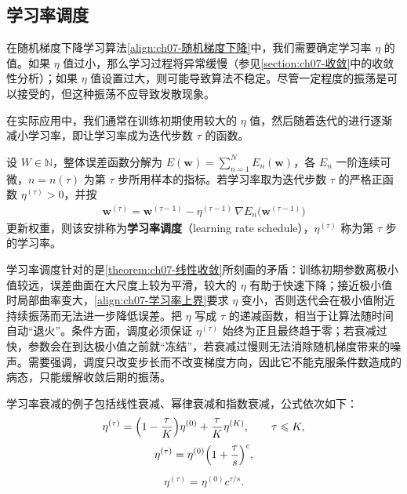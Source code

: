 \documentclass[../../main.tex]{subfiles}
\begin{document}
\subsection{学习率调度}\label{subsection:ch07-学习率调度}

在随机梯度下降学习算法\eqref{align:ch07-随机梯度下降}中，我们需要确定学习率 $\eta$ 的值。如果 $\eta$ 值过小，那么学习过程将异常缓慢（参见\cref{section:ch07-收敛}中的收敛性分析）；如果 $\eta$ 值设置过大，则可能导致算法不稳定。尽管一定程度的振荡是可以接受的，但这种振荡不应导致发散现象。

在实际应用中，我们通常在训练初期使用较大的 $\eta$ 值，然后随着迭代的进行逐渐减小学习率，即让学习率成为迭代步数 $\tau$ 的函数。

\begin{definition}[学习率调度]\label{definition:ch07-学习率调度}
设 $W\in\mathbb{N}$，整体误差函数分解为 $E(\mathbf{w})=\sum_{n=1}^{N}E_{n}(\mathbf{w})$，各 $E_{n}$ 一阶连续可微，$n=n(\tau)$ 为第 $\tau$ 步所用样本的指标。若学习率取为迭代步数 $\tau$ 的严格正函数 $\eta^{(\tau)}>0$，并按
\begin{align}
\mathbf{w}^{(\tau)} = \mathbf{w}^{(\tau-1)}-\eta^{(\tau-1)}\,\nabla E_n\bigl(\mathbf{w}^{(\tau-1)}\bigr)
\label{align:ch07-学习率调度}
\end{align}
更新权重，则该安排称为\textbf{学习率调度}（learning rate schedule），$\eta^{(\tau)}$ 称为第 $\tau$ 步的学习率。
\end{definition}

\begin{remark}
学习率调度针对的是\cref{theorem:ch07-线性收敛}所刻画的矛盾：训练初期参数离极小值较远，误差曲面在大尺度上较为平滑，较大的 $\eta$ 有助于快速下降；接近极小值时局部曲率变大，\eqref{align:ch07-学习率上界}要求 $\eta$ 变小，否则迭代会在极小值附近持续振荡而无法进一步降低误差。把 $\eta$ 写成 $\tau$ 的递减函数，相当于让算法随时间自动“退火”。条件方面，调度必须保证 $\eta^{(\tau)}$ 始终为正且最终趋于零；若衰减过快，参数会在到达极小值之前就“冻结”，若衰减过慢则无法消除随机梯度带来的噪声。需要强调，调度只改变步长而不改变梯度方向，因此它不能克服条件数造成的病态，只能缓解收敛后期的振荡。
\end{remark}

学习率衰减的例子包括线性衰减、幂律衰减和指数衰减，公式依次如下：
\begin{align}
\eta^{(\tau)} = \Bigl(1-\frac{\tau}{K}\Bigr)\eta^{(0)}+\frac{\tau}{K}\eta^{(K)},\qquad \tau\leqslant K,
\label{align:ch07-线性衰减}
\end{align}
\begin{align}
\eta^{(\tau)} = \eta^{(0)}\Bigl(1+\frac{\tau}{s}\Bigr)^{c},
\label{align:ch07-幂律衰减}
\end{align}
\begin{align}
\eta^{(\tau)} = \eta^{(0)}c^{\tau/s}.
\label{align:ch07-指数衰减}
\end{align}
\end{document}
